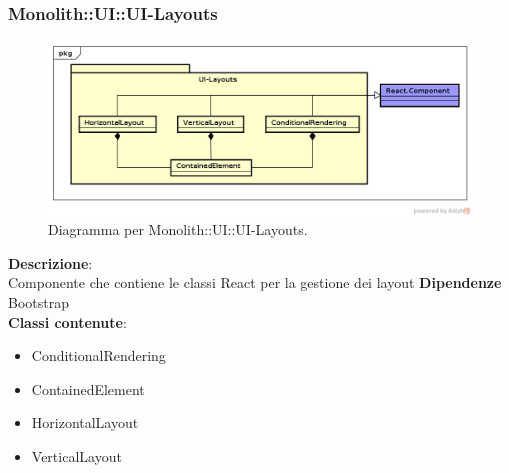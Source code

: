 \clearpage

\subsubsection{Monolith::UI::UI-Layouts}
   \FloatBarrier
   \begin{figure}[ht]
   \centering
\includegraphics[width=\textwidth,keepaspectratio]{img/UI-Layouts}
   \caption{Diagramma per Monolith::UI::UI-Layouts.}
\end{figure}
\FloatBarrier
\textbf{Descrizione}:\\
 Componente che contiene le classi React per la gestione dei layout
\textbf{Dipendenze} \\
Bootstrap 
\\ \textbf{Classi contenute}:\\
\begin{itemize}
\item ConditionalRendering
\item ContainedElement
\item HorizontalLayout
\item VerticalLayout
\end{itemize}


\clearpage

